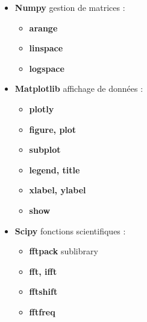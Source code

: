 
\begin{itemize}
	\item \textbf{Numpy} gestion de matrices :
	\begin{itemize}
		\item \textbf{arange}
		\item \textbf{linspace}
		\item \textbf{logspace}	
	\end{itemize}
	\item \textbf{Matplotlib} affichage de données :
	\begin{itemize}
		\item \textbf{plotly} 
		\item \textbf{figure, plot}
		\item \textbf{subplot}
		\item \textbf{legend, title}	
		\item \textbf{xlabel, ylabel}	
		\item \textbf{show}	
	\end{itemize}	
	\item \textbf{Scipy} fonctions scientifiques :
	\begin{itemize}
		\item \textbf{fftpack} sublibrary
		\item \textbf{fft, ifft}
		\item \textbf{fftshift}		
		\item \textbf{fftfreq}
	\end{itemize}
\end{itemize}